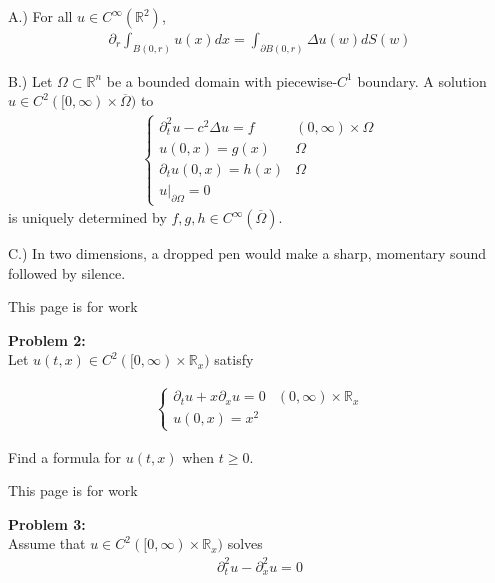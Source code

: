 \documentclass{article}
\newcommand{\R}{{\mathbb{R}}}
\newcommand{\cl}[1]{{\overline{#1}}}
\newcommand{\pd}{\partial}
\begin{document}
\vspace{1 cm}
A.) For all $u \in C^{\infty}(\R^{2})$, 
\begin{align*}
	\pd_{r} \int_{B(0,r)} u(x) dx = \int_{\pd B(0,r)} \Delta u(w) dS(w)
\end{align*}


\vspace{3 cm}
B.) Let $\Omega \subset \R^{n}$ be a bounded domain with piecewise-$C^{1}$ boundary. A solution $u \in C^{2}([0,\infty) \times \cl{\Omega})$ to 
\begin{align*}
	\begin{cases} 
		\pd_{t}^{2} u - c^{2} \Delta u = f & (0,\infty) \times \Omega \\
		u(0,x) = g(x) & \Omega \\
		\pd_{t} u (0,x) = h(x) & \Omega \\
		u | _{\pd \Omega} = 0
	\end{cases}
\end{align*}
is uniquely determined by $f,g,h \in C^{\infty}(\cl{\Omega})$. 

\vspace{3 cm}
C.) In two dimensions, a dropped pen would make a sharp, momentary sound followed by silence. 


\newpage

This page is for work
\newpage



\textbf{Problem 2:} \\

Let $u(t,x) \in C^{2}([0,\infty) \times \R_{x})$ satisfy

\begin{align*}
	\begin{cases}
		\pd_{t}u + x\pd_{x}u = 0 & (0,\infty) \times \R_{x} \\
		u(0,x) = x^2
	\end{cases}
\end{align*}

Find a formula for $u(t,x)$ when $t \geq 0$. 


\newpage

\vspace{0.5 cm}

\newpage

This page is for work
\newpage



\textbf{Problem 3:} \\

Assume that $u \in C^{2}([0,\infty) \times \R_{x})$ solves 
\begin{align*}
	\pd_{t}^{2} u - \pd_{x}^2 u = 0
\end{align*}
\end{document}
